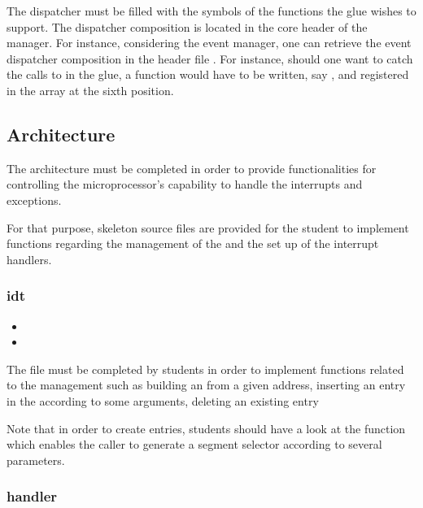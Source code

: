 The dispatcher must be filled with the symbols of the functions the
glue wishes to support. The dispatcher composition is located in the
core header of the manager. For instance, considering the event manager,
one can retrieve the event dispatcher composition  in
the header file . For instance,
should one want to catch the calls to  in
the glue, a function would have to be written, say
, and registered in the
 array at the sixth position.

\subsection{Architecture}

The architecture must be completed in order to provide functionalities for
controlling the microprocessor's capability to handle the interrupts and
exceptions.

For that purpose, skeleton source files are provided for the student to
implement functions regarding the management of the  and the set up of the interrupt handlers.

\subsubsection*{idt}

\begin{itemize}
  \item
  \item
\end{itemize}

The file  must be completed by students in order to
implement functions related to the  management such as building
an  from a given address, inserting an entry in the 
according to some arguments, deleting an existing  entry \etc{}

Note that in order to create  entries, students should have a look
at the function  which enables the
caller to generate a segment selector according to several parameters.

\subsubsection*{handler}

